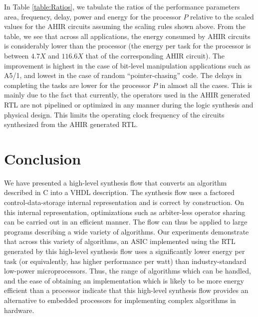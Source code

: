 \documentclass[conference]{IEEEtran}
\begin{document}
In Table \ref{table:Ratios}, we tabulate the ratios of
the performance parameters area, frequency, delay, power
and energy for the processor $P$ relative to the scaled values
for the AHIR circuits assuming the scaling rules shown above.
From the table, we see that across all applications, the energy consumed
by AHIR circuits is considerably lower than the
processor (the energy per task for the processor is
between $4.7X$ and $116.6X$ that of the corresponding AHIR circuit).  
The improvement is highest in the case of
bit-level manipulation applications such as A5/1, and
lowest in the case of random ``pointer-chasing'' code.
The delays in completing the tasks are lower 
for the processor $P$ in almost all the cases.  This
is mainly due to the fact that currently, the operators used in 
the AHIR generated RTL are not pipelined or optimized in any
manner during the logic synthesis and physical
design. This limits the operating clock frequency of the circuits
synthesized from the AHIR generated RTL.  
%
%


\section{Conclusion}

We have presented a high-level synthesis flow that converts
an algorithm described in C into a VHDL description.  The
synthesis flow uses a factored control-data-storage internal representation
and is correct by construction.  On this internal
representation, optimizations such as arbiter-less operator sharing 
can be carried out in an efficient manner.  The flow can thus
be applied to large programs describing a wide variety of algorithms.
Our experiments demonstrate that across this variety of
algorithms, an ASIC
implemented using the RTL generated by this high-level
synthesis flow uses a significantly lower energy per task (or equivalently,
has higher performance per watt) than industry-standard low-power microprocessors. 
Thus, the range of algorithms
which can be handled, and the ease of obtaining an implementation
which is likely to be more energy efficient than a processor 
indicate that this high-level synthesis flow provides an 
alternative to embedded processors for implementing complex algorithms in hardware.

%
%



\end{document}
